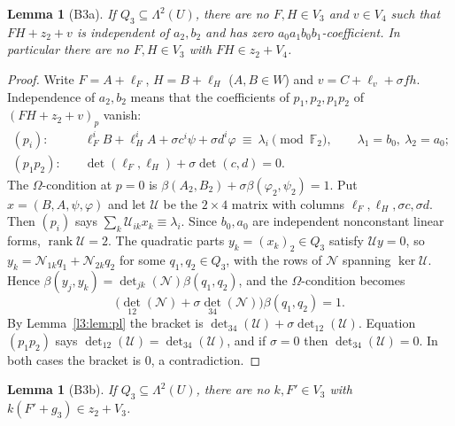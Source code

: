 \documentclass[11pt,a4paper]{article}
\theoremstyle{plain}
\newtheorem{lemma}[theorem]{Lemma}
\theoremstyle{remark}
\newcommand{\F}{\mathbb F_2}
\newcommand{\rk}{\operatorname{rank}}
\newcommand{\Lam}{\Lambda^2}
\begin{document}
\begin{lemma}[B3a]\label{l3:lem:B3a}
If $Q_3\subseteq\Lam(U)$, there are no $F,H\in V_3$ and $v\in V_4$ such that $FH+z_2+v$ is independent of $a_2,b_2$ and has zero $a_0a_1b_0b_1$-coefficient. In particular there are no $F,H\in V_3$ with $FH\in z_2+V_4$.
\end{lemma}

\begin{proof}
Write $F=A+\ell_F$, $H=B+\ell_H$ ($A,B\in W$) and $v=C+\ell_v+\sigma fh$. Independence of $a_2,b_2$ means that the coefficients of $p_1,p_2,p_1p_2$ of $(FH+z_2+v)_p$ vanish:
\begin{align*}
(p_i):&\quad \ell_F^iB+\ell_H^iA+\sigma c^i\psi+\sigma d^i\varphi\ \equiv\ \lambda_i\pmod{\F},\qquad \lambda_1=b_0,\ \lambda_2=a_0;\\
(p_1p_2):&\quad \det(\ell_F,\ell_H)+\sigma\det(c,d)=0 .
\end{align*}
The $\Omega$-condition at $p=0$ is $\beta(A_2,B_2)+\sigma\beta(\varphi_2,\psi_2)=1$. Put $x=(B,A,\psi,\varphi)$ and let $\mathcal U$ be the $2\times4$ matrix with columns $\ell_F,\ell_H,\sigma c,\sigma d$. Then $(p_i)$ says $\sum_k\mathcal U_{ik}x_k\equiv\lambda_i$.
Since $b_0,a_0$ are independent nonconstant linear forms, $\rk\mathcal U=2$. The quadratic parts $y_k=(x_k)_2\in Q_3$ satisfy $\mathcal Uy=0$, so $y_k=\mathcal N_{1k}q_1+\mathcal N_{2k}q_2$ for some $q_1,q_2\in Q_3$, with the rows of $\mathcal N$ spanning $\ker\mathcal U$. Hence $\beta(y_j,y_k)=\det_{jk}(\mathcal N)\beta(q_1,q_2)$, and the $\Omega$-condition becomes
\[
\bigl(\det_{12}(\mathcal N)+\sigma\det_{34}(\mathcal N)\bigr)\beta(q_1,q_2)=1 .
\]
By Lemma~\ref{l3:lem:pl} the bracket is $\det_{34}(\mathcal U)+\sigma\det_{12}(\mathcal U)$. Equation $(p_1p_2)$ says $\det_{12}(\mathcal U)=\det_{34}(\mathcal U)$, and if $\sigma=0$ then $\det_{34}(\mathcal U)=0$. In both cases the bracket is $0$, a contradiction.
\end{proof}

\begin{lemma}[B3b]\label{l3:lem:B3b}
If $Q_3\subseteq\Lam(U)$, there are no $k,F'\in V_3$ with $k(F'+g_3)\in z_2+V_3$.
\end{lemma}
\end{document}

